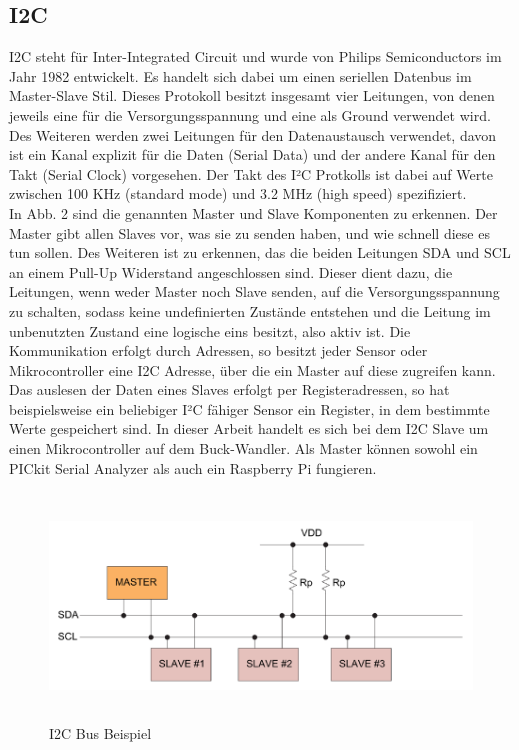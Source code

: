 \subsection{I2C}
I2C steht für Inter-Integrated Circuit und wurde von Philips Semiconductors im Jahr 1982 entwickelt. Es handelt sich dabei um einen seriellen Datenbus im Master-Slave Stil. Dieses Protokoll besitzt insgesamt vier Leitungen, von denen jeweils eine für die Versorgungsspannung und eine als Ground verwendet wird. Des Weiteren werden zwei Leitungen für den Datenaustausch verwendet, davon ist ein Kanal explizit für die Daten (Serial Data) und der andere Kanal für den Takt (Serial Clock) vorgesehen. Der Takt des I²C Protkolls ist dabei auf Werte zwischen 100 KHz (standard mode) und 3.2 MHz (high speed) spezifiziert. 
\\
In Abb. 2 sind die genannten Master und Slave Komponenten zu erkennen. Der Master gibt allen Slaves vor, was sie zu senden haben, und wie schnell diese es tun sollen. Des Weiteren ist zu erkennen, das die beiden Leitungen SDA und SCL an einem Pull-Up Widerstand angeschlossen sind. Dieser dient dazu, die Leitungen, wenn weder Master noch Slave senden, auf die Versorgungsspannung zu schalten, sodass keine undefinierten Zustände entstehen und die Leitung im unbenutzten Zustand eine logische eins besitzt, also aktiv ist. Die Kommunikation erfolgt durch Adressen, so besitzt jeder Sensor oder Mikrocontroller eine I2C Adresse, über die ein Master auf diese zugreifen kann. Das auslesen der Daten eines Slaves erfolgt per Registeradressen, so hat beispielsweise ein beliebiger I²C fähiger Sensor ein Register, in dem bestimmte Werte gespeichert sind. In dieser Arbeit handelt es sich bei dem I2C Slave um einen Mikrocontroller auf dem Buck-Wandler. Als Master können sowohl ein PICkit Serial Analyzer als auch ein Raspberry Pi fungieren.


\begin{figure}[H]
    \centering
    \includegraphics[height= 6cm, width = \textwidth]{Pictures/I2C_Bus.png}
    \caption{I2C Bus Beispiel }
\end{figure}

